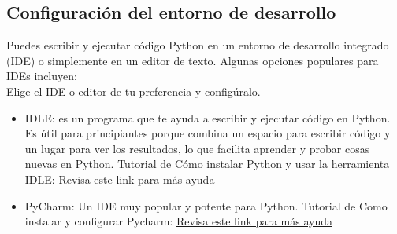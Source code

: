 \subsection{Configuración del entorno de desarrollo}
Puedes escribir y ejecutar código Python en un entorno de desarrollo integrado (IDE) o simplemente en un editor de texto. Algunas opciones populares para IDEs incluyen:\\

Elige el IDE o editor de tu preferencia y configúralo.
\begin{itemize}
    \item IDLE: es un programa que te ayuda a escribir y ejecutar código en Python. Es útil para principiantes porque combina un espacio para escribir código y un lugar para ver los resultados, lo que facilita aprender y probar cosas nuevas en Python. Tutorial de Cómo instalar Python y usar la herramienta IDLE: 
    \href{https://www.youtube.com/watch?v=F9eM_VoKGJQ}{Revisa este link para más ayuda}
    \begin{figure}[h]
        \centering
      \end{figure}

    \item PyCharm: Un IDE muy popular y potente para Python. Tutorial de Como instalar y configurar Pycharm:
    \href{https://www.youtube.com/watch?v=wxdafAAzIWo }{Revisa este link para más ayuda}
    \begin{figure}[h]
        \centering
      \end{figure}


\end{itemize}
